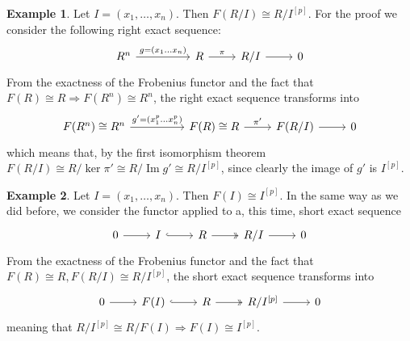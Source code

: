 \documentclass[leqno]{article}
\theoremstyle{definition}
\newtheorem{example}{Example}[section]
\DeclareMathOperator{\im}{Im}
\begin{document}
\begin{example} Let $I = (x_1, \ldots, x_n)$. Then $F(R / I) \cong R / I ^{[p]}$. For the proof we consider the following right exact sequence:
\[\begin{tikzcd}
	{R^n} && R & {R/I} & 0
	\arrow["\pi", from=1-3, to=1-4]
	\arrow[from=1-4, to=1-5]
	\arrow["{g = (x_1 \ldots x_n)}", from=1-1, to=1-3]
\end{tikzcd}\]
 From the exactness of the Frobenius functor and the fact that $F(R)\cong R \Rightarrow F(R^n)\cong R^n$, the right exact sequence transforms into
\[\begin{tikzcd}
	{F(R^n)\cong R^n} && {F(R)\cong R} & {F(R/I)} & 0
	\arrow["{\pi'}", from=1-3, to=1-4]
	\arrow[from=1-4, to=1-5]
	\arrow["{g' = (x_1^p \ldots x_n^p)}", from=1-1, to=1-3]
\end{tikzcd}\]
which means that, by the first isomorphism theorem $F(R / I) \cong R / \ker \pi' \cong R / \im g' \cong R / I^{[p]} $, since clearly the image of $g'$ is  $I ^{[p]}$.
\end{example}


\begin{example} Let $I = (x_1, \ldots, x_n)$. Then $F(I) \cong I ^{[p]}$. In the same way as we did before, we consider the functor applied to a, this time, short exact sequence
\[\begin{tikzcd}
	0 & I & R & {R/I} & 0
	\arrow[from=1-1, to=1-2]
	\arrow[hook, from=1-2, to=1-3]
	\arrow[two heads, from=1-3, to=1-4]
	\arrow[from=1-4, to=1-5]
\end{tikzcd}\]
From the exactness of the Frobenius functor and the fact that $F(R)\cong R, F(R / I) \cong R / I ^{[p]}$, the short exact sequence transforms into
\[\begin{tikzcd}
	0 & {F(I)} & R & {R/I^{[p]}} & 0
	\arrow[from=1-1, to=1-2]
	\arrow[hook, from=1-2, to=1-3]
	\arrow[two heads, from=1-3, to=1-4]
	\arrow[from=1-4, to=1-5]
\end{tikzcd}\]
meaning that $R / I ^{[p]} \cong R / F(I) \Rightarrow F(I)\cong I ^{[p]}$.
\end{example}
\end{document}
